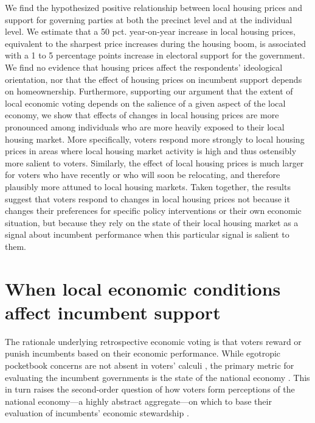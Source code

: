 \documentclass[12pt,a4paper]{article}
\begin{document}
	We find the hypothesized positive relationship between local housing prices and support for governing parties at both the precinct level and at the individual level. We estimate that a 50 pct. year-on-year increase in local housing prices, equivalent to the sharpest price increases during the housing boom, is associated with a 1 to 5 percentage points increase in electoral support for the government. We find no evidence that housing prices affect the respondents’ ideological orientation, nor that the effect of housing prices on incumbent support depends on homeownership. Furthermore, supporting our argument that the extent of local economic voting depends on the salience of a given aspect of the local economy, we show that effects of changes in local housing prices are more pronounced among individuals who are more heavily exposed to their local housing market. More specifically, voters respond more strongly to local housing prices in areas where local housing market activity is high and thus ostensibly more salient to voters. Similarly, the effect of local housing prices is much larger for voters who have recently or who will soon be relocating, and therefore plausibly more attuned to local housing markets. Taken together, the results suggest that voters respond to changes in local housing prices not because it changes their preferences for specific policy interventions or their own economic situation, but because they rely on the state of their local housing market as a signal about incumbent performance when this particular signal is salient to them.
	
	\section{When local economic conditions affect incumbent support}
	The rationale underlying retrospective economic voting is that voters reward or punish incumbents based on their economic performance. While egotropic pocketbook concerns are not absent in voters’ calculi \citep{healy2017digging, tilley2017pound}, the primary metric for evaluating the incumbent governments is the state of the national economy \citep{kinder1979economic,lewis2013vp}. This in turn raises the second-order question of how voters form perceptions of the national economy—a highly abstract aggregate—on which to base their evaluation of incumbents’ economic stewardship \citep{reeves2012ecologies}. 
	
\end{document}
